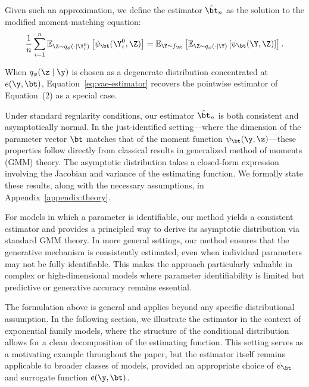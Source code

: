 {Given such an approximation, we define the estimator \( \hat\bt_n \) as the solution to the modified moment-matching equation:
\begin{equation}
\label{eq:vae-estimator}
\frac{1}{n} \sum_{i=1}^n \mathbb{E}_{\Z \sim q_\phi(\cdot \mid \Y_i^0)} \left[ \psi_\bt(\Y_i^0, \Z) \right]
=
\mathbb{E}_{\Y \sim f_\bt}
\left[
\mathbb{E}_{\Z \sim q_\phi(\cdot \mid \Y)} 
\left[ 
\psi_\bt(\Y, \Z)
\right]
\right].
\end{equation}

When \( q_\phi(\z \mid \y) \) is chosen as a degenerate distribution concentrated at \( e(\y, \bt) \), Equation~\eqref{eq:vae-estimator} recovers the pointwise estimator of Equation~(2) as a special case.





Under standard regularity conditions, our estimator $\hat\bt_n$ is both consistent and asymptotically normal. In the just-identified setting—where the dimension of the parameter vector $\bt$ matches that of the moment function $\psi_\bt(\y, \z)$—these properties follow directly from classical results in generalized method of moments (GMM) theory. The asymptotic distribution takes a closed-form expression involving the Jacobian and variance of the estimating function. We formally state these results, along with the necessary assumptions, in Appendix~\ref{appendix:theory}.

For models in which a parameter is identifiable, our method yields a consistent estimator and provides a principled way to derive its asymptotic distribution via standard GMM theory. In more general settings, our method ensures that the generative mechanism is consistently estimated, even when individual parameters may not be fully identifiable. This makes the approach particularly valuable in complex or high-dimensional models where parameter identifiability is limited but predictive or generative accuracy remains essential.


The formulation above is general and applies beyond any specific distributional assumption. In the following section, we illustrate the estimator in the context of exponential family models, where the structure of the conditional distribution allows for a clean decomposition of the estimating function. This setting serves as a motivating example throughout the paper, but the estimator itself remains applicable to broader classes of models, provided an appropriate choice of $\psi_\bt$ and surrogate function $e(\y, \bt)$.

}

